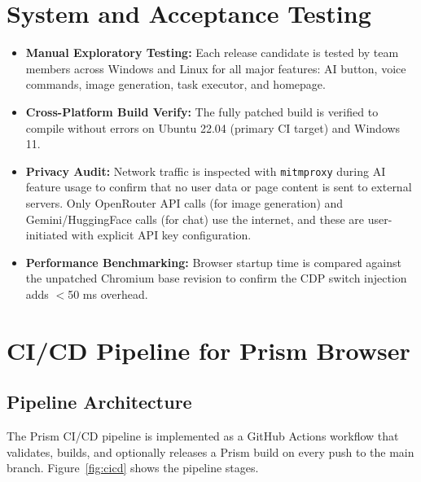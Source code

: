 \section{System and Acceptance Testing}
\begin{itemize}[leftmargin=*]
    \item \textbf{Manual Exploratory Testing:} Each release candidate is tested by team members across Windows and Linux for all major features: AI button, voice commands, image generation, task executor, and homepage.
    \item \textbf{Cross-Platform Build Verify:} The fully patched build is verified to compile without errors on Ubuntu 22.04 (primary CI target) and Windows 11.
    \item \textbf{Privacy Audit:} Network traffic is inspected with \texttt{mitmproxy} during AI feature usage to confirm that no user data or page content is sent to external servers. Only OpenRouter API calls (for image generation) and Gemini/HuggingFace calls (for chat) use the internet, and these are user-initiated with explicit API key configuration.
    \item \textbf{Performance Benchmarking:} Browser startup time is compared against the unpatched Chromium base revision to confirm the CDP switch injection adds $<$50 ms overhead.
\end{itemize}

\section{CI/CD Pipeline for Prism Browser}

\subsection{Pipeline Architecture}
The Prism CI/CD pipeline is implemented as a GitHub Actions workflow that validates, builds, and optionally releases a Prism build on every push to the main branch. Figure~\ref{fig:cicd} shows the pipeline stages.

